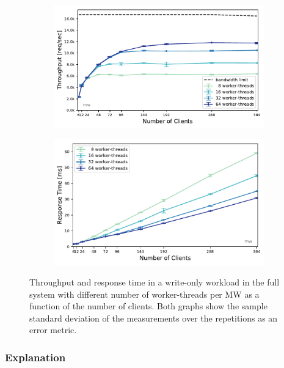\documentclass[report.tex]{subfiles}
\begin{document}
\begin{figure}[H]
	\begin{subfigure}[b]{.49\linewidth}
		\centering
		\includegraphics[width=\linewidth]{data/exp41_wo_tp_nc_w.pdf}
	\end{subfigure}\hfill
	\begin{subfigure}[b]{.49\linewidth}
		\centering
		\includegraphics[width=\linewidth]{data/exp41_wo_rt_nc_w.pdf}
	\end{subfigure}%
	\caption{Throughput and response time in a write-only workload in the full system with different number of worker-threads per MW as a function of the number of clients. Both graphs show the sample standard deviation of the measurements over the repetitions as an error metric.}\label{exp41_tp_rt_nc}
\end{figure}



\subsubsection{Explanation}
\end{document}
